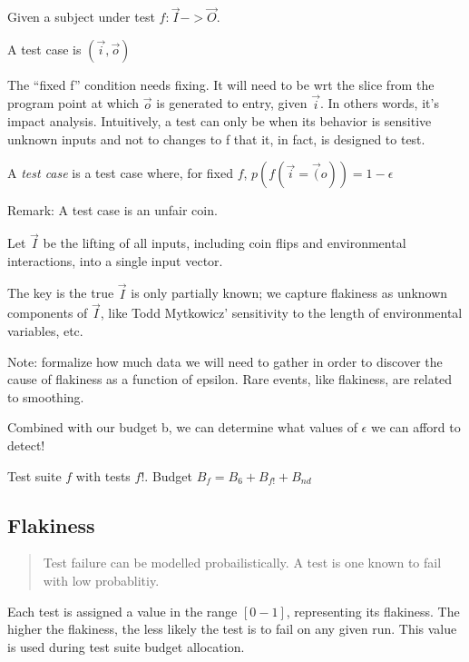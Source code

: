 \begin{defn}
	Given a subject under test $f: \vec{I} -> \vec{O}$.

	A test case is $(\vec{i},\vec{o})$

	The “fixed f” condition needs fixing. It will need to be wrt the slice from the program point at which $\vec{o}$ is generated to entry, given $\vec{i}$. In others words, it’s impact analysis. Intuitively, a test can only be \flaky{} when its behavior is sensitive unknown inputs and not to changes to f that it, in fact, is designed to test.

	A \emph{\flaky{} test case} is a test case where, for fixed $f$,
	$p(f(\vec{i} = \vec(o)) = 1 - \epsilon$

	Remark: A \flaky{} test case is an unfair coin.

	Let $\vec{I}$ be the lifting of all inputs, including coin flips and environmental interactions, into a single input vector.

	The key is the true $\vec{I}$ is only partially known;  we capture flakiness as unknown components of $\vec{I}$, like Todd Mytkowicz’ sensitivity to the length of environmental variables, etc.

	Note: formalize how much data we will need to gather in order to discover the cause of flakiness as a function of epsilon. Rare events, like flakiness, are related to smoothing.

	Combined with our budget b, we can determine what values of $\epsilon$ we can afford to detect!
\end{defn}

Test suite $f$ with \flaky{} tests $f!$.
Budget $B_{f} = B_{6} + B_{f!} + B_{nd}$

\subsection{Flakiness}

\begin{quote}
	Test failure can be modelled probailistically. A \flaky{} test is one known to fail with low probablitiy.
\end{quote}

\begin{defn}\label{def:flakytest}



\end{defn}

Each test is assigned a value in the range $[0-1]$, representing its flakiness. The higher the flakiness, the less likely the test is to fail on any given run. This value is used during test suite budget allocation.

